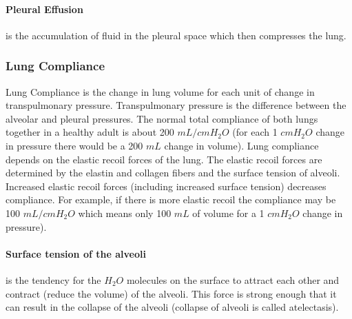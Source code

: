 \paragraph{Pleural Effusion} is the accumulation of fluid in the pleural space which then compresses the lung.

\subsubsection{Lung Compliance} 

Lung Compliance is the change in lung volume for each unit of change in transpulmonary pressure. Transpulmonary pressure is the difference between the alveolar and pleural pressures. The normal total compliance of both lungs together in a healthy adult is about 200 $mL/cm H_2O$ (for each 1  $cm H_2O$ change in pressure there would be a 200 $mL$ change in volume). 
Lung compliance depends on the elastic recoil forces of the lung. The elastic recoil forces are determined by the elastin and collagen fibers and the surface tension of alveoli. Increased elastic recoil forces (including increased surface tension) decreases compliance. For example, if there is more elastic recoil the compliance may be 100 $mL/cm H_2O$ which means only 100 $mL$ of volume for a 1 $cm H_2O$ change in pressure).

\paragraph{Surface tension of the alveoli} is the tendency for the $H_2O$ molecules on the surface to attract each other and contract (reduce the volume) of the alveoli. This force is strong enough that it can result in the collapse of the alveoli (collapse of alveoli is called atelectasis).

